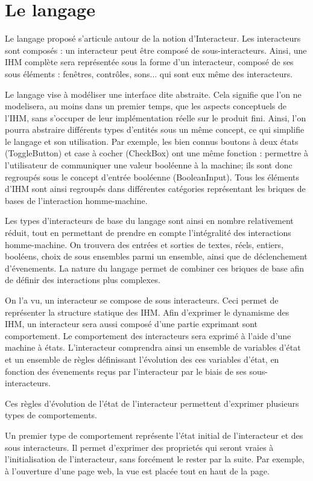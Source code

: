 \documentclass{ihm}
\begin{document}
\section{Le langage} 

Le langage proposé s'articule autour de la notion d'Interacteur.
Les interacteurs sont composés : un interacteur peut être
composé de sous-interacteurs. Ainsi, une IHM complète sera
représentée sous la forme d'un interacteur, composé de ses sous
éléments : fenêtres, contrôles, sons... qui sont eux même des
interacteurs.

Le langage vise à modéliser une interface dite abstraite. Cela
signifie que l'on ne modelisera, au moins dans un premier temps,
que les aspects conceptuels de l'IHM, sans s'occuper de leur
implémentation réelle sur le produit fini. Ainsi, l'on pourra
abstraire différents types d'entités sous un même concept, ce
qui simplifie le langage et son utilisation. Par exemple, les
bien connus boutons à deux états (ToggleButton) et case à cocher
(CheckBox) ont une même fonction : permettre à l'utilisateur de
communiquer une valeur booléenne à la machine; ils sont donc
regroupés sous le concept d'entrée booléenne (BooleanInput).
Tous les éléments d'IHM sont ainsi regroupés dans différentes
catégories représentant les briques de bases de l'interaction
homme-machine.

Les types d'interacteurs de base du langage sont ainsi en nombre
relativement réduit, tout en permettant de prendre en compte
l'intégralité des interactions homme-machine. On trouvera des
entrées et sorties de textes, réels, entiers, booléens, choix de
sous ensembles parmi un ensemble, ainsi que de déclenchement
d'évenements. La nature du langage permet de combiner ces
briques de base afin de définir des interactions plus complexes.

On l'a vu, un interacteur se compose de sous interacteurs. Ceci
permet de représenter la structure statique des IHM. Afin
d'exprimer le dynamisme des IHM, un interacteur sera aussi
composé d'une partie exprimant sont comportement. Le
comportement des interacteurs sera exprimé à l'aide d'une
machine à états. L'interacteur comprendra ainsi un ensemble de
variables d'état et un ensemble de règles définissant
l'évolution des ces variables d'état, en fonction des évenements
reçus par l'interacteur par le biais de ses sous-interacteurs.

Ces règles d'évolution de l'état de l'interacteur permettent
d'exprimer plusieurs types de comportements.

Un premier type de comportement représente l'état initial de
l'interacteur et des sous interacteurs. Il permet d'exprimer des
proprietés qui seront vraies à l'initialisation de
l'interacteur, sans forcément le rester par la suite. Par
exemple, à l'ouverture d'une page web, la vue est placée tout en
haut de la page.
\end{document}
